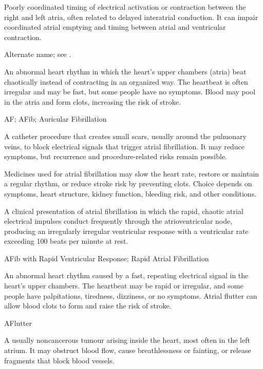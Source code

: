  Poorly coordinated timing of electrical activation or contraction between the right and left atria, often related to delayed interatrial conduction. It can impair coordinated atrial emptying and timing between atrial and ventricular contraction.

 Alternate name; see .

 An abnormal heart rhythm in which the heart's upper chambers (atria) beat chaotically instead of contracting in an organized way. The heartbeat is often irregular and may be fast, but some people have no symptoms. Blood may pool in the atria and form clots, increasing the risk of stroke.

\synonyms
AF; AFib; Auricular Fibrillation

 A catheter procedure that creates small scars, usually around the pulmonary veins, to block electrical signals that trigger atrial fibrillation. It may reduce symptoms, but recurrence and procedure-related risks remain possible.

 Medicines used for atrial fibrillation may slow the heart rate, restore or maintain a regular rhythm, or reduce stroke risk by preventing clots. Choice depends on symptoms, heart structure, kidney function, bleeding risk, and other conditions.

 A clinical presentation of atrial fibrillation in which the rapid, chaotic atrial electrical impulses conduct frequently through the atrioventricular node, producing an irregularly irregular ventricular response with a ventricular rate exceeding 100 beats per minute at rest.

\synonyms
AFib with Rapid Ventricular Response; Rapid Atrial Fibrillation

 An abnormal heart rhythm caused by a fast, repeating electrical signal in the heart’s upper chambers. The heartbeat may be rapid or irregular, and some people have palpitations, tiredness, dizziness, or no symptoms. Atrial flutter can allow blood clots to form and raise the risk of stroke.

\synonyms
AFlutter

 A usually noncancerous tumour arising inside the heart, most often in the left atrium. It may obstruct blood flow, cause breathlessness or fainting, or release fragments that block blood vessels.


